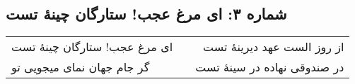 \begin{center}
\section*{شماره ۳: ای مرغ عجب! ستارگان چینۀ تست}
\label{sec:003}
\begin{longtable}{l p{0.5cm} r}
ای مرغ عجب! ستارگان چینهٔ تست
&&
از روز الست عهد دیرینهٔ تست
\\
گر جام جهان نمای میجویی تو
&&
در صندوقی نهاده در سینهٔ تست
\\
\end{longtable}
\end{center}
